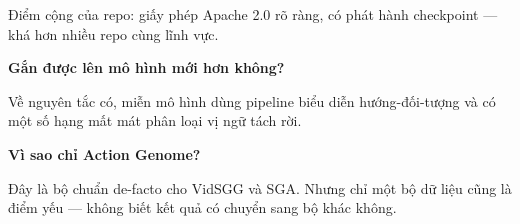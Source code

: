 \documentclass[11pt,a4paper]{article}
\begin{document}
Điểm cộng của repo: giấy phép Apache 2.0 rõ ràng, có phát hành checkpoint --- khá hơn nhiều repo cùng lĩnh vực.

\textbf{Gắn được lên mô hình mới hơn không?}

Về nguyên tắc có, miễn mô hình dùng pipeline biểu diễn hướng-đối-tượng và có một số hạng mất mát phân loại vị ngữ tách rời.

\textbf{Vì sao chỉ Action Genome?}

Đây là bộ chuẩn de-facto cho VidSGG và SGA. Nhưng chỉ một bộ dữ liệu cũng là điểm yếu --- không biết kết quả có chuyển sang bộ khác không.
\end{document}
